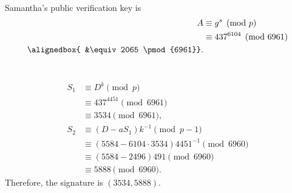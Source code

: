 \documentclass[
  coursecode={MTHE 418},
  assignmentname={Homework \homeworknumber},
  studentnumber=20053722,
  name={Bryan Hoang},
  draft,
]{
  ltxanswer%
}
\begin{document}
  \begin{questions}
    \setcounter{question}{\questionnumber}
    \addtocounter{question}{-1}
    \question[10]\
    \begin{parts}
      \part{}
      \begin{solution}
        Samantha's public verification key is
        \begin{align*}
          A            &\equiv g^{s} \pmod{p}         \\
                       &\equiv 437^{6104} \pmod{6961} \\
          \alignedbox{ &\equiv 2065 \pmod{6961}}.
        \end{align*}
      \end{solution}

      \part{}
      \begin{solution}
        \begin{align*}
          S_{1} &\equiv D^{k} \pmod{p}                                \\
                &\equiv 437^{4451} \pmod{6961}                        \\
                &\equiv 3534 \pmod{6961},                             \\
          S_{2} &\equiv (D - aS_{1})k^{-1} \pmod{p-1}                 \\
                &\equiv (5584 - 6104 \cdot 3534)4451^{-1} \pmod{6960} \\
                &\equiv (5584 - 2496)491 \pmod{6960}                  \\
                &\equiv 5888 \pmod{6960}.
        \end{align*}
        Therefore, the signature is \(\boxed{(3534, 5888)}\).
      \end{solution}
    \end{parts}
  \end{questions}
\end{document}
